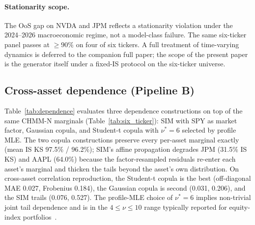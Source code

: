 \documentclass[sigconf,anonymous,nonacm=true]{acmart}
\begin{document}
\paragraph{Stationarity scope.} The OoS gap on NVDA and JPM reflects a
stationarity violation under the 2024--2026 macroeconomic regime, not a
model-class failure. The same six-ticker panel passes at $\geq 90\%$ on
four of six tickers. A full treatment of time-varying dynamics is
deferred to the companion full paper; the scope of the present paper is
the generator itself under a fixed-IS protocol on the six-ticker
universe.

\subsection{Cross-asset dependence (Pipeline B)}

Table~\ref{tab:dependence} evaluates three dependence constructions on
top of the same CHMM-N marginals (Table~\ref{tab:six_ticker}): SIM with
SPY as market factor, Gaussian copula, and Student-t copula with
$\nu^* = 6$ selected by profile MLE. The two copula constructions
preserve every per-asset marginal exactly (mean IS KS
97.5\% / 96.2\%); SIM's affine propagation degrades JPM (31.5\% IS KS)
and AAPL (64.0\%) because the factor-resampled residuals re-enter each
asset's marginal and thicken the tails beyond the asset's own
distribution. On cross-asset correlation reproduction, the Student-t
copula is the best (off-diagonal MAE 0.027, Frobenius 0.184), the
Gaussian copula is second (0.031, 0.206), and the SIM trails (0.076,
0.527). The profile-MLE choice of $\nu^* = 6$ implies non-trivial joint
tail dependence and is in the $4 \leq \nu \leq 10$ range typically
reported for equity-index portfolios~\cite{demarta2005tcopula,
mcneil2015quantitative}.
\end{document}
